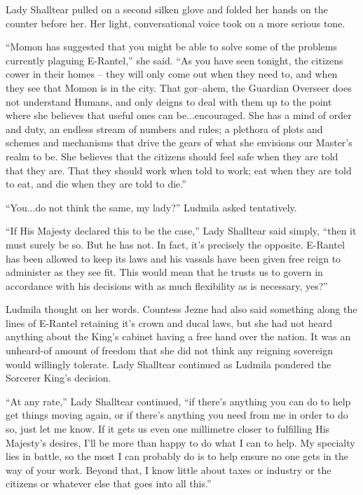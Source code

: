  

Lady Shalltear pulled on a second silken glove and folded her hands on the counter before her. Her light, conversational voice took on a more serious tone.

 

“Momon has suggested that you might be able to solve some of the problems currently plaguing E-Rantel,” she said. “As you have seen tonight, the citizens cower in their homes – they will only come out when they need to, and when they see that Momon is in the city. That gor–ahem, the Guardian Overseer does not understand Humans, and only deigns to deal with them up to the point where she believes that useful ones can be...encouraged. She has a mind of order and duty, an endless stream of numbers and rules; a plethora of plots and schemes and mechanisms that drive the gears of what she envisions our Master’s realm to be. She believes that the citizens should feel safe when they are told that they are. That they should work when told to work; eat when they are told to eat, and die when they are told to die.”

 

“You...do not think the same, my lady?” Ludmila asked tentatively.

 

“If His Majesty declared this to be the case,” Lady Shalltear said simply, “then it must surely be so. But he has not. In fact, it's precisely the opposite. E-Rantel has been allowed to keep its laws and his vassals have been given free reign to administer as they see fit. This would mean that he trusts us to govern in accordance with his decisions with as much flexibility as is necessary, yes?”

 

Ludmila thought on her words. Countess Jezne had also said something along the lines of E-Rantel retaining it’s crown and ducal laws, but she had not heard anything about the King’s cabinet having a free hand over the nation. It was an unheard-of amount of freedom that she did not think any reigning sovereign would willingly tolerate. Lady Shalltear continued as Ludmila pondered the Sorcerer King’s decision.

 

“At any rate,” Lady Shalltear continued, “if there’s anything you can do to help get things moving again, or if there’s anything you need from me in order to do so, just let me know. If it gets us even one millimetre closer to fulfilling His Majesty’s desires, I'll be more than happy to do what I can to help. My specialty lies in battle, so the most I can probably do is to help ensure no one gets in the way of your work. Beyond that, I know little about taxes or industry or the citizens or whatever else that goes into all this.”

